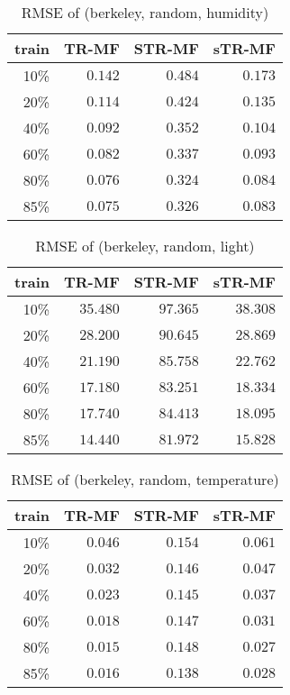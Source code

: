 \begin{table} [htbp]
\setlength{\tabcolsep}{2pt}
\centering
\caption{RMSE of (berkeley, random, humidity)}
\label{table:spatial_random_hum}
\begin{tabular} {r | r r r}
	train	& TR-MF	&	STR-MF	&	sTR-MF	\\ \hline
	10\% & $ \mathbf{ 0.142 } $ & $ 0.484 $ & $ 0.173 $ \\
	20\% & $ \mathbf{ 0.114 } $ & $ 0.424 $ & $ 0.135 $ \\
	40\% & $ \mathbf{ 0.092 } $ & $ 0.352 $ & $ 0.104 $ \\
	60\% & $ \mathbf{ 0.082 } $ & $ 0.337 $ & $ 0.093 $ \\
	80\% & $ \mathbf{ 0.076 } $ & $ 0.324 $ & $ 0.084 $ \\
	85\% & $ \mathbf{ 0.075 } $ & $ 0.326 $ & $ 0.083 $ \\
\end{tabular}
\end{table}


\begin{table} [htbp]
\setlength{\tabcolsep}{2pt}
\centering
\caption{RMSE of (berkeley, random, light)}
\label{table:spatial_random_light}
\begin{tabular} {r | r r r}
	train	& TR-MF	&	STR-MF	&	sTR-MF	\\ \hline
	10\% & $ \mathbf{ 35.480 } $ & $ 97.365 $ & $ 38.308 $ \\
	20\% & $ \mathbf{ 28.200 } $ & $ 90.645 $ & $ 28.869 $ \\
	40\% & $ \mathbf{ 21.190 } $ & $ 85.758 $ & $ 22.762 $ \\
	60\% & $ \mathbf{ 17.180 } $ & $ 83.251 $ & $ 18.334 $ \\
	80\% & $ \mathbf{ 17.740 } $ & $ 84.413 $ & $ 18.095 $ \\
	85\% & $ \mathbf{ 14.440 } $ & $ 81.972 $ & $ 15.828 $ \\
\end{tabular}
\end{table}


\begin{table} [htbp]
\setlength{\tabcolsep}{2pt}
\centering
\caption{RMSE of (berkeley, random, temperature)}
\label{table:spatial_random_tem}
\begin{tabular} {r | r r r}
	train	& TR-MF	&	STR-MF	&	sTR-MF	\\ \hline
	10\% & $ \mathbf{ 0.046 } $ & $ 0.154 $ & $ 0.061 $ \\
	20\% & $ \mathbf{ 0.032 } $ & $ 0.146 $ & $ 0.047 $ \\
	40\% & $ \mathbf{ 0.023 } $ & $ 0.145 $ & $ 0.037 $ \\
	60\% & $ \mathbf{ 0.018 } $ & $ 0.147 $ & $ 0.031 $ \\
	80\% & $ \mathbf{ 0.015 } $ & $ 0.148 $ & $ 0.027 $ \\
	85\% & $ \mathbf{ 0.016 } $ & $ 0.138 $ & $ 0.028 $ \\
\end{tabular}
\end{table}




